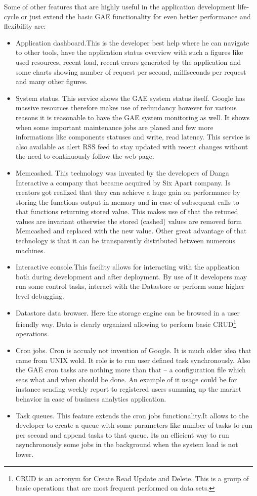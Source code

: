 Some of other features that are highly useful in the application development life-cycle or just extend the basic GAE functionality for even better performance and flexibility are:
\begin{itemize}
\item{Application dashboard.This is the developer best help where he can navigate to other tools, have the application status overview with such a figures like used resources, recent load, recent errors generated by the application and some charts showing number of request per second, milliseconds per request and many other figures.}
\item{System status. This service shows the GAE system status itself. Google has massive resources therefore makes use of redundancy however for various reasons it is reasonable to have the GAE system monitoring as well. It shows when some important maintenance jobs are planed and few more informations like components statuses and write, read latency. This service is also available as alert RSS feed to stay updated with recent changes without the need to continuously follow the web page.}
\item{Memcashed. This technology was invented by the developers of Danga Interactive a company that became acquired by Six Apart company. Is creators got realized that they can achieve a huge gain on performance by storing the functions output in memory and in case of subsequent calls to that functions returning stored value. This makes use of that the retuned values are invariant otherwise the stored (cashed) values are removed form Memcashed and replaced with the new value. Other great advantage of that technology is that it can be transparently distributed between numerous machines.} 
\item{Interactive console.This facility allows for interacting with the application both during development and after deployment. By use of it developers may run some control tasks, interact with the Datastore or perform some higher level debugging.}
\item{Datastore data browser. Here the storage engine can be browsed in a user friendly way. Data is clearly organized allowing to perform basic CRUD\footnote{CRUD is an acronym for Create Read Update and Delete. This is a group of basic operations that are most frequent performed on data sets.} operations.}
\item{Cron jobs.} Cron is accualy not invention of Google. It is much older idea that came from UNIX wold. It role is to run user defined task synchronously. Also the GAE cron tasks are nothing more than that -- a configuration file which seas what and when should be done. An example of it usage could be for instance sending weekly report to registered users summing up the market behavior in case of business analytics application.     
\item{Task queues.} This feature extends the cron jobs functionality.It allows to the developer to create a queue with some parameters like number of tasks to run per second and append tasks to that queue. Its an efficient way to run asynchronously some jobs in the background when the system load is not lower.  
\end{itemize}

